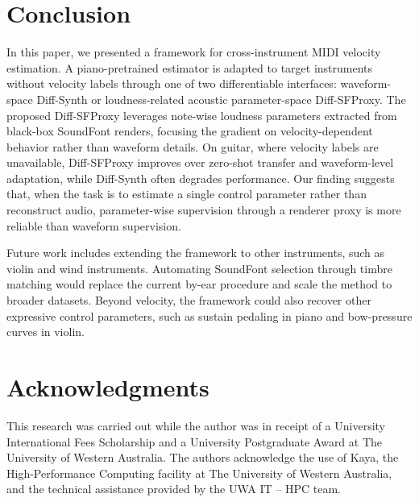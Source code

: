 \documentclass{article}
\begin{document}
\section{Conclusion}
In this paper, we presented a framework for cross-instrument MIDI velocity estimation. A piano-pretrained estimator is adapted to target instruments without velocity labels through one of two differentiable interfaces: waveform-space Diff-Synth or loudness-related acoustic parameter-space Diff-SFProxy. The proposed Diff-SFProxy leverages note-wise loudness parameters extracted from black-box SoundFont renders, focusing the gradient on velocity-dependent behavior rather than waveform details. On guitar, where velocity labels are unavailable, Diff-SFProxy improves over zero-shot transfer and waveform-level adaptation, while Diff-Synth often degrades performance. Our finding suggests that, when the task is to estimate a single control parameter rather than reconstruct audio, parameter-wise supervision through a renderer proxy is more reliable than waveform supervision.

Future work includes extending the framework to other instruments, such as violin and wind instruments. Automating SoundFont selection through timbre matching would replace the current by-ear procedure and scale the method to broader datasets. Beyond velocity, the framework could also recover other expressive control parameters, such as sustain pedaling in piano and bow-pressure curves in violin.

\section{Acknowledgments}
This research was carried out while the author was in receipt of a University International Fees Scholarship and a University Postgraduate Award at The University of Western Australia. The authors acknowledge the use of Kaya, the High-Performance Computing facility at The University of Western Australia, and the technical assistance provided by the UWA IT – HPC team.
 

 
\end{document}
